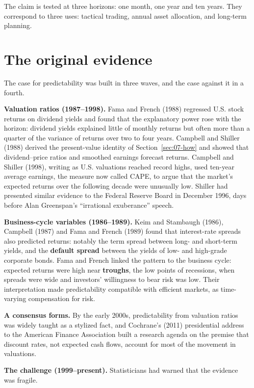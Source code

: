 The claim is tested at three horizons: one month, one year and ten years. They correspond to three uses: tactical trading, annual asset allocation, and long-term planning.

\section{The original evidence}
\label{sec:07-evidence}

The case for predictability was built in three waves, and the case against it in a fourth.

\textbf{Valuation ratios (1987--1998).} Fama and French (1988) regressed U.S. stock returns on dividend yields and found that the explanatory power rose with the horizon: dividend yields explained little of monthly returns but often more than a quarter of the variance of returns over two to four years. Campbell and Shiller (1988) derived the present-value identity of Section~\ref{sec:07-how} and showed that dividend--price ratios and smoothed earnings forecast returns. Campbell and Shiller (1998), writing as U.S. valuations reached record highs, used ten-year average earnings, the measure now called CAPE, to argue that the market's expected returns over the following decade were unusually low. Shiller had presented similar evidence to the Federal Reserve Board in December 1996, days before Alan Greenspan's ``irrational exuberance'' speech.

\textbf{Business-cycle variables (1986--1989).} Keim and Stambaugh (1986), Campbell (1987) and Fama and French (1989) found that interest-rate spreads also predicted returns: notably the term spread between long- and short-term yields, and the \textbf{default spread} between the yields of low- and high-grade corporate bonds. Fama and French linked the pattern to the business cycle: expected returns were high near \textbf{troughs}, the low points of recessions, when spreads were wide and investors' willingness to bear risk was low. Their interpretation made predictability compatible with efficient markets, as time-varying compensation for risk.

\textbf{A consensus forms.} By the early 2000s, predictability from valuation ratios was widely taught as a stylized fact, and Cochrane's (2011) presidential address to the American Finance Association built a research agenda on the premise that discount rates, not expected cash flows, account for most of the movement in valuations.

\textbf{The challenge (1999--present).} Statisticians had warned that the evidence was fragile.

